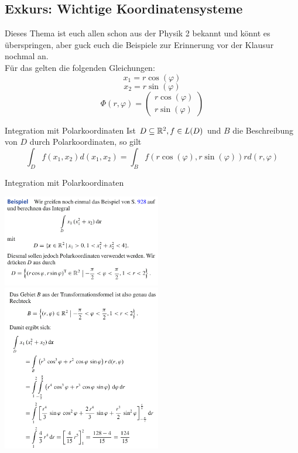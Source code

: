 \subsection{Exkurs: Wichtige Koordinatensysteme}
Dieses Thema ist euch allen schon aus der Physik 2 bekannt und könnt es überspringen, aber guck euch die Beispiele zur Erinnerung vor der Klausur nochmal an. \\
Für das  gelten die folgenden Gleichungen:
$$x_1=r\cos(\varphi)$$
$$x_2=r\sin(\varphi)$$
$$\Phi(r, \varphi) = \begin{pmatrix}
    r\cos(\varphi) \\
    r\sin(\varphi)
\end{pmatrix}$$
\begin{Def}{Integration mit Polarkoordinaten}
Ist $D\subseteq \mathbb{R}^2, f\in L(D)$ und $B$ die Beschreibung von $D$ durch Polarkoordinaten, so gilt
$$\int_D f(x_1,x_2)d(x_1,x_2) = \int_B f(r\cos(\varphi), r\sin(\varphi))rd(r, \varphi)$$
\end{Def}
\begin{Beispiel}{Integration mit Polarkoordinaten}
\begin{center}
    \includegraphics[width=0.52\textwidth]{Dateien/Polarkoord1.png}
    \includegraphics[width=0.52\textwidth]{Dateien/Polarkoord2.png}
\end{center}
\end{Beispiel}


